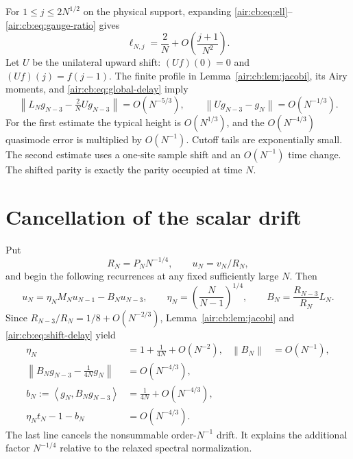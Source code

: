 \documentclass[11pt,letterpaper]{article}
\numberwithin{equation}{section}
\theoremstyle{remark}
\newcommand{\norm}[1]{\left\lVert#1\right\rVert}
\newcommand{\ip}[2]{\left\langle#1,#2\right\rangle}
\begin{document}
For $1\le j\le2N^{1/2}$ on the physical support, expanding \eqref{air:cb:eq:ell}--\eqref{air:cb:eq:gauge-ratio} gives
\[
\ell_{N,j}=\frac2N+O\!\left(\frac{j+1}{N^2}\right).
\]
Let $U$ be the unilateral upward shift: $(Uf)(0)=0$ and $(Uf)(j)=f(j-1)$.
The finite profile in Lemma~\ref{air:cb:lem:jacobi}, its Airy moments, and
\eqref{air:cb:eq:global-delay} imply
\begin{equation}\label{air:cb:eq:shift-delay}
\norm{L_Ng_{N-3}-\tfrac2N Ug_{N-3}}=O(N^{-5/3}),\qquad
\norm{Ug_{N-3}-g_N}=O(N^{-1/3}).
\end{equation}
For the first estimate the typical height is $O(N^{1/3})$, and the
$O(N^{-4/3})$ quasimode error is multiplied by $O(N^{-1})$. Cutoff tails
are exponentially small. The second estimate uses a one-site sample shift
and an $O(N^{-1})$ time change. The shifted parity is exactly the parity
occupied at time $N$.

\section{Cancellation of the scalar drift}

Put
\begin{equation}\label{air:cb:eq:renormalize}
R_N=P_NN^{-1/4},\qquad u_N=v_N/R_N,
\end{equation}
and begin the following recurrences at any fixed sufficiently large $N$.
Then
\begin{equation}\label{air:cb:eq:normalized-delay}
u_N=\eta_NM_Nu_{N-1}-B_Nu_{N-3},\qquad
\eta_N=\left(\frac N{N-1}\right)^{1/4},\qquad
B_N=\frac{R_{N-3}}{R_N}L_N.
\end{equation}
Since $R_{N-3}/R_N=1/8+O(N^{-2/3})$, Lemma~\ref{air:cb:lem:jacobi} and
\eqref{air:cb:eq:shift-delay} yield
\begin{equation}\label{air:cb:eq:drift}
\begin{aligned}
\eta_N&=1+\frac1{4N}+O(N^{-2}),& \norm{B_N}&=O(N^{-1}),\\
\norm{B_Ng_{N-3}-\tfrac1{4N}g_N}&=O(N^{-4/3}),\\
b_N:=\ip{g_N}{B_Ng_{N-3}}&=\frac1{4N}+O(N^{-4/3}),\\
\eta_Nt_N-1-b_N&=O(N^{-4/3}).
\end{aligned}
\end{equation}
The last line cancels the nonsummable order-$N^{-1}$ drift. It explains the
additional factor $N^{-1/4}$ relative to the relaxed spectral normalization.
\end{document}
